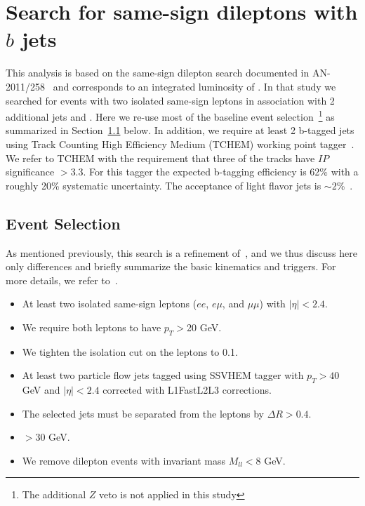 \section{Search for same-sign dileptons with $b$ jets}
\label{sec:searchbtag}

This analysis is based on the same-sign dilepton search documented in AN-2011/258~\cite{ssnote2011} and corresponds to an
integrated luminosity of \intLumi. In that study we searched for events with two isolated same-sign leptons
in association with 2 additional jets and \met. Here we re-use most of the baseline event selection~\footnote{The additional 
$Z$ veto is not applied in this study} as summarized in Section~\ref{sec:eventsel} below. 
In addition, we require at least 2 b-tagged jets using Track Counting High Efficiency 
Medium (TCHEM) working point tagger~\cite{BTVPAS2011}. We refer to TCHEM with the requirement that three of the tracks have $IP$ 
significance $ > 3.3$. For this tagger the expected b-tagging efficiency is 62\% with a roughly 20\% systematic uncertainty.
The acceptance of light flavor jets is $\sim 2$\%~\cite{BTVPAS2011}.

\subsection{Event Selection}
\label{sec:eventsel}

As mentioned previously, this search is a refinement of~\cite{ssnote2011}, and we thus discuss here only differences and briefly summarize the basic kinematics and triggers.
For more details, we refer to~\cite{ssnote2011}.

\begin{itemize}
\item At least two isolated same-sign leptons ($ee$, $e\mu$, and $\mu\mu$) with $|\eta| < 2.4$.
\item We require both leptons to have $p_T>$20 GeV.
\item We tighten the isolation cut on the leptons to 0.1.
\item At least two particle flow jets tagged using SSVHEM tagger with $p_T > 40$ GeV and $|\eta| < 2.4$
corrected with L1FastL2L3 corrections.
\item The selected jets must be separated from the leptons by $\Delta R > 0.4$.
\item \met $> 30$ GeV.
\item We remove dilepton events with invariant mass $M_{ll} < 8$ GeV.
\end{itemize}

